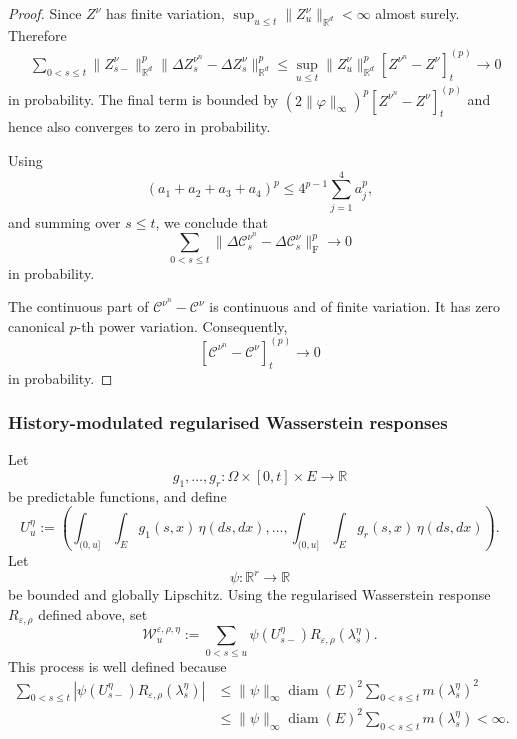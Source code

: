 \documentclass[a4paper,10pt]{article}
\begin{document}
\begin{proof}
Since \(Z^\nu\) has finite variation,
$
        \sup_{u\le t}
        \lVert Z_u^\nu\rVert_{\mathbb R^d}
        <
        \infty
$
almost surely. Therefore
\[
\begin{aligned}
&\sum_{0<s\le t}
\lVert Z_{s-}^\nu\rVert_{\mathbb R^d}^p
\lVert
\Delta Z_s^{\nu^n}-\Delta Z_s^\nu
\rVert_{\mathbb R^d}^p
\le
\sup_{u\le t}
\lVert Z_u^\nu\rVert_{\mathbb R^d}^p
[Z^{\nu^n}-Z^\nu]^{(p)}_t
\longrightarrow0
\end{aligned}
\]
in probability. The final term is bounded by
$
(2\lVert\varphi\rVert_\infty)^p
[Z^{\nu^n}-Z^\nu]^{(p)}_t
$
and hence also converges to zero in probability.

Using
\[
        (a_1+a_2+a_3+a_4)^p
        \le
        4^{p-1}
        \sum_{j=1}^4a_j^p,
\]
and summing over \(s\le t\), we conclude that
\[
\sum_{0<s\le t}
\lVert
\Delta\mathcal C_s^{\nu^n}
-
\Delta\mathcal C_s^\nu
\rVert_{\mathrm F}^p
\longrightarrow0
\]
in probability.

The continuous part of
\(\mathcal C^{\nu^n}-\mathcal C^\nu\) is continuous and of finite
variation. It has zero canonical \(p\)-th power variation. Consequently,
\[
        [\mathcal C^{\nu^n}-\mathcal C^\nu]^{(p)}_t
        \longrightarrow0
\]
in probability.
\end{proof}


\subsubsection{History-modulated regularised Wasserstein responses}

Let
\[
        g_1,\ldots,g_r:
        \Omega\times[0,t]\times E\longrightarrow\mathbb R
\]
be predictable functions, and define
\[
U_u^\eta
:=
\left(
\int_{(0,u]}\int_Eg_1(s,x)\,\eta(ds,dx),
\ldots,
\int_{(0,u]}\int_Eg_r(s,x)\,\eta(ds,dx)
\right).
\]
Let
\[
        \psi:\mathbb R^r\longrightarrow\mathbb R
\]
be bounded and globally Lipschitz. Using the regularised Wasserstein
response \(R_{\varepsilon,\rho}\) defined above, set
\[
\mathcal W_u^{\varepsilon,\rho,\eta}
:=
\sum_{0<s\le u}
\psi(U_{s-}^\eta)
R_{\varepsilon,\rho}(\lambda_s^\eta).
\]
This process is well defined because
\[
\begin{aligned}
\sum_{0<s\le t}
\left|
\psi(U_{s-}^\eta)
R_{\varepsilon,\rho}(\lambda_s^\eta)
\right|
&\le
\lVert\psi\rVert_\infty
\operatorname{diam}(E)^2
\sum_{0<s\le t}m(\lambda_s^\eta)^2
\\
&\le
\lVert\psi\rVert_\infty
\operatorname{diam}(E)^2
\sum_{0<s\le t}m(\lambda_s^\eta)
<
\infty.
\end{aligned}
\]
\end{document}
